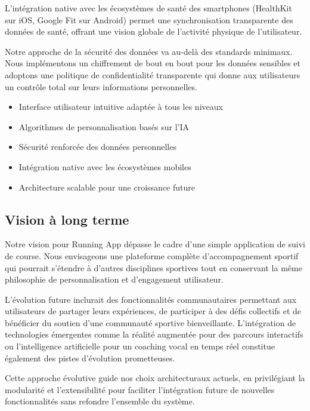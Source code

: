 L'intégration native avec les écosystèmes de santé des smartphones (HealthKit sur iOS, Google Fit sur Android) permet une synchronisation transparente des données de santé, offrant une vision globale de l'activité physique de l'utilisateur.

Notre approche de la sécurité des données va au-delà des standards minimaux. Nous implémentons un chiffrement de bout en bout pour les données sensibles et adoptons une politique de confidentialité transparente qui donne aux utilisateurs un contrôle total sur leurs informations personnelles.

\begin{successbox}
\begin{itemize}[leftmargin=1cm]
\item Interface utilisateur intuitive adaptée à tous les niveaux
\item Algorithmes de personnalisation basés sur l'IA
\item Sécurité renforcée des données personnelles
\item Intégration native avec les écosystèmes mobiles
\item Architecture scalable pour une croissance future
\end{itemize}
\end{successbox}

\subsection{Vision à long terme}

Notre vision pour Running App dépasse le cadre d'une simple application de suivi de course. Nous envisageons une plateforme complète d'accompagnement sportif qui pourrait s'étendre à d'autres disciplines sportives tout en conservant la même philosophie de personnalisation et d'engagement utilisateur.

L'évolution future inclurait des fonctionnalités communautaires permettant aux utilisateurs de partager leurs expériences, de participer à des défis collectifs et de bénéficier du soutien d'une communauté sportive bienveillante. L'intégration de technologies émergentes comme la réalité augmentée pour des parcours interactifs ou l'intelligence artificielle pour un coaching vocal en temps réel constitue également des pistes d'évolution prometteuses.

Cette approche évolutive guide nos choix architecturaux actuels, en privilégiant la modularité et l'extensibilité pour faciliter l'intégration future de nouvelles fonctionnalités sans refondre l'ensemble du système.